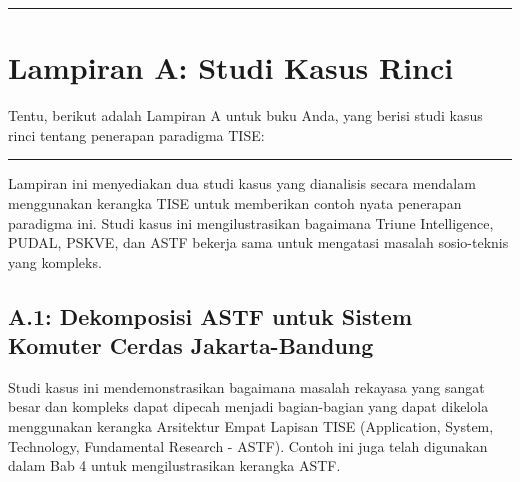 \documentclass[
  letterpaper,
  DIV=11,
  numbers=noendperiod]{scrreprt}
\begin{document}
\begin{center}\rule{0.5\linewidth}{0.5pt}\end{center}


\chapter{\texorpdfstring{\textbf{Lampiran A: Studi Kasus
Rinci}}{Lampiran A: Studi Kasus Rinci}}\label{lampiran-a-studi-kasus-rinci}

Tentu, berikut adalah Lampiran A untuk buku Anda, yang berisi studi
kasus rinci tentang penerapan paradigma TISE:

\begin{center}\rule{0.5\linewidth}{0.5pt}\end{center}

Lampiran ini menyediakan dua studi kasus yang dianalisis secara mendalam
menggunakan kerangka TISE untuk memberikan contoh nyata penerapan
paradigma ini. Studi kasus ini mengilustrasikan bagaimana Triune
Intelligence, PUDAL, PSKVE, dan ASTF bekerja sama untuk mengatasi
masalah sosio-teknis yang kompleks.

\section{\texorpdfstring{\textbf{A.1: Dekomposisi ASTF untuk Sistem
Komuter Cerdas
Jakarta-Bandung}}{A.1: Dekomposisi ASTF untuk Sistem Komuter Cerdas Jakarta-Bandung}}\label{a.1-dekomposisi-astf-untuk-sistem-komuter-cerdas-jakarta-bandung}

Studi kasus ini mendemonstrasikan bagaimana masalah rekayasa yang sangat
besar dan kompleks dapat dipecah menjadi bagian-bagian yang dapat
dikelola menggunakan kerangka Arsitektur Empat Lapisan TISE
(Application, System, Technology, Fundamental Research - ASTF). Contoh
ini juga telah digunakan dalam Bab 4 untuk mengilustrasikan kerangka
ASTF.
\end{document}
